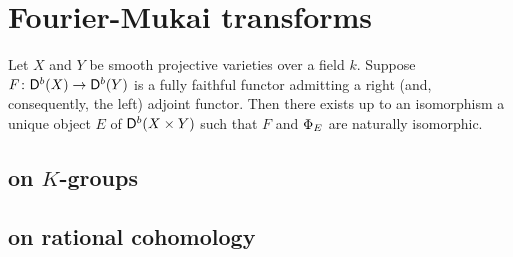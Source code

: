 \section{Fourier-Mukai transforms}

\begin{theorem}
    \label{Orlov's theorem}
    Let $X$ and $Y$ be smooth projective varieties over a field $k$. Suppose $F \colon \mathsf{D}^b(X) \to \mathsf{D}^b(Y)$ is a fully faithful functor admitting a right (and, consequently, the left) adjoint functor. Then there exists up to an isomorphism a unique object $E$ of $\mathsf{D}^b(X \times Y)$ such that $F$ and $\Phi_{E}$ are naturally isomorphic.
\end{theorem}

\subsection{on $K$-groups}
\subsection{on rational cohomology}